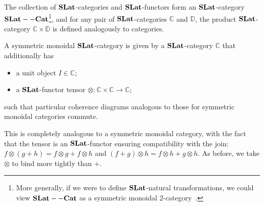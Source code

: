The collection of $\mathbf{SLat}$-categories and $\mathbf{SLat}$-functors form an $\mathbf{SLat}$-category $\mathbf{SLat}--\mathbf{Cat}$\footnote{More generally, if we were to define $\mathbf{SLat}$-natural transformations, we could view $\mathbf{SLat}--\mathbf{Cat}$ as a symmetric monoidal 2-category~\cite{Kelly2022BASICCO}.}, and for any pair of $\mathbf{SLat}$-categories $\mathbb{C}$ and $\mathbb{D}$, the product $\mathbf{SLat}$-category $\mathbb{C} \times \mathbb{D}$ is defined analogously to categories.

\begin{definition}%
	\label{def:enriched-prop}
	A symmetric monoidal $\mathbf{SLat}$-category is given by a $\mathbf{SLat}$-category $\mathbb{C}$ that additionally has
	\begin{itemize}
		\item a unit object $I \in \mathbb{C}$;
		\item a $\mathbf{SLat}$-functor tensor $\otimes\colon \mathbb{C} \times \mathbb{C} \to \mathbb{C}$;
	\end{itemize}
	such that particular coherence diagrams analogous to those for symmetric monoidal categories commute.
\end{definition}
This is completely analogous to a symmetric monoidal category, with the fact that the tensor is an $\mathbf{SLat}$-functor ensuring compatibility with the join: $f \otimes (g+h) = f \otimes g + f \otimes h $ and $ (f+g) \otimes h = f \otimes h + g \otimes h$.
As before, we take $\otimes$ to bind more tightly than $+$.

